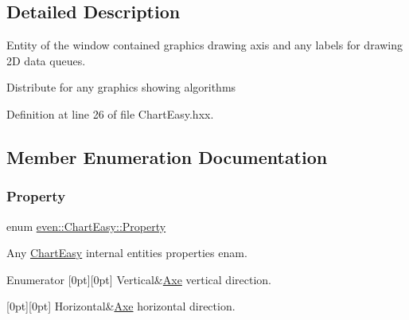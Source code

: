 \subsection{Detailed Description}
Entity of the window contained graphics drawing axis and any labels for drawing 2D data queues. 

Distribute for any graphics showing algorithms 

Definition at line 26 of file Chart\+Easy.\+hxx.



\subsection{Member Enumeration Documentation}
\mbox{\label{classeven_1_1_chart_easy_a3a647749c693d508d8af5a039f4f8848}} 
\subsubsection{\texorpdfstring{Property}{Property}}
{\footnotesize\ttfamily enum \mbox{\hyperlink{classeven_1_1_chart_easy_a3a647749c693d508d8af5a039f4f8848}{even\+::\+Chart\+Easy\+::\+Property}}}



Any \mbox{\hyperlink{classeven_1_1_chart_easy}{Chart\+Easy}} internal entities properties enam. 

\begin{DoxyEnumFields}{Enumerator}
[0pt][0pt]{}\mbox{\label{classeven_1_1_chart_easy_a3a647749c693d508d8af5a039f4f8848a172e0ac78844af6ef8b18f01ee58d361}} 
Vertical&\mbox{\hyperlink{structeven_1_1_chart_easy_1_1_axe}{Axe}} vertical direction. \\
\hline

[0pt][0pt]{}\mbox{\label{classeven_1_1_chart_easy_a3a647749c693d508d8af5a039f4f8848a6635c6b4db87a9c90e5bf12ed8ed37ce}} 
Horizontal&\mbox{\hyperlink{structeven_1_1_chart_easy_1_1_axe}{Axe}} horizontal direction. \\
\hline

\end{DoxyEnumFields}



